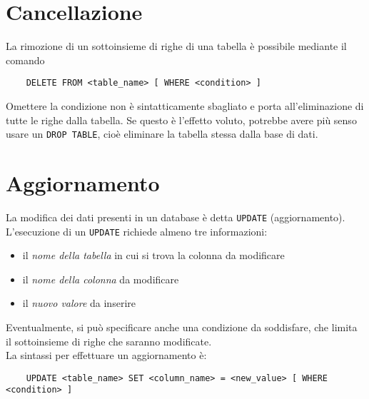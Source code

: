 \documentclass[12pt,a4paper]{book}
\begin{document}
	\section{Cancellazione}
	La rimozione di un sottoinsieme di righe di una tabella è possibile mediante il comando
	\begin{lstlisting}
	DELETE FROM <table_name> [ WHERE <condition> ]
	\end{lstlisting}
	Omettere la condizione non è sintatticamente sbagliato e porta all'eliminazione di tutte le righe dalla tabella. Se questo è l'effetto voluto, potrebbe avere più senso usare un \texttt{DROP TABLE}, cioè eliminare la tabella stessa dalla base di dati.
	\section{Aggiornamento}
	La modifica dei dati presenti in un database è detta \texttt{UPDATE} (aggiornamento).\\L'esecuzione di un \texttt{UPDATE} richiede almeno tre informazioni:
	\begin{itemize}
		\item il\textit{ nome della tabella} in cui si trova la colonna da modificare
		\item il \textit{nome della colonna} da modificare
		\item il \textit{nuovo valore} da inserire
	\end{itemize}
	Eventualmente, si può specificare anche una condizione da soddisfare, che limita il sottoinsieme di righe che saranno modificate.\\
	La sintassi per effettuare un aggiornamento è:
	\begin{lstlisting}
	UPDATE <table_name> SET <column_name> = <new_value> [ WHERE <condition> ]
	\end{lstlisting}
\end{document}
